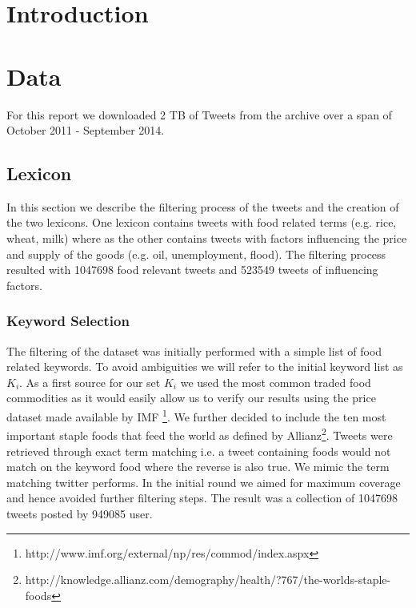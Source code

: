 \documentclass[12pt]{report}
\begin{document}
\setcounter{page}{1}
\chapter{Introduction}















\chapter{Data}

For this report we downloaded 2 TB of Tweets from the archive over a span of  October 2011 - September 2014.

\section{Lexicon}

In this section we describe the filtering process of the tweets and the creation of the two lexicons.  One lexicon contains tweets with food related terms (e.g. rice, wheat, milk) where as the other contains tweets with factors influencing the price and supply of the goods (e.g. oil, unemployment, flood). The filtering process resulted with 1047698 food relevant tweets and 523549  tweets of influencing factors. 

\subsection{Keyword Selection}

The filtering of the dataset was initially performed with a simple list of food related keywords. To avoid ambiguities we will refer to the initial keyword list as $K_i$. As a first source for our set $K_i$ we used the most common traded food commodities as it would easily allow us to verify our results using the price dataset made available by IMF \footnote{http://www.imf.org/external/np/res/commod/index.aspx}. We further decided to include the ten most important staple foods that feed the world as defined by Allianz\footnote{http://knowledge.allianz.com/demography/health/?767/the-worlds-staple-foods}. Tweets were retrieved through exact term matching i.e. a tweet containing foods would not match on the keyword food where the reverse is also true. We mimic the term matching twitter performs. In the initial round we aimed for maximum coverage and hence avoided further filtering steps. The result was a collection of 1047698 tweets posted by 949085 user. 
\end{document}
